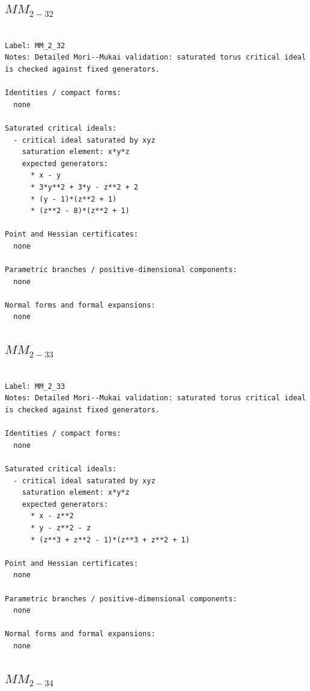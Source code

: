 \documentclass[10pt,a4paper]{article}
\begin{document}
\subsection*{$ MM_{2-32} $}

\begin{lstlisting}

Label: MM_2_32
Notes: Detailed Mori--Mukai validation: saturated torus critical ideal is checked against fixed generators.

Identities / compact forms:
  none

Saturated critical ideals:
  - critical ideal saturated by xyz
    saturation element: x*y*z
    expected generators:
      * x - y
      * 3*y**2 + 3*y - z**2 + 2
      * (y - 1)*(z**2 + 1)
      * (z**2 - 8)*(z**2 + 1)

Point and Hessian certificates:
  none

Parametric branches / positive-dimensional components:
  none

Normal forms and formal expansions:
  none

\end{lstlisting}

\subsection*{$ MM_{2-33} $}

\begin{lstlisting}

Label: MM_2_33
Notes: Detailed Mori--Mukai validation: saturated torus critical ideal is checked against fixed generators.

Identities / compact forms:
  none

Saturated critical ideals:
  - critical ideal saturated by xyz
    saturation element: x*y*z
    expected generators:
      * x - z**2
      * y - z**2 - z
      * (z**3 + z**2 - 1)*(z**3 + z**2 + 1)

Point and Hessian certificates:
  none

Parametric branches / positive-dimensional components:
  none

Normal forms and formal expansions:
  none

\end{lstlisting}

\subsection*{$ MM_{2-34} $}
\end{document}
